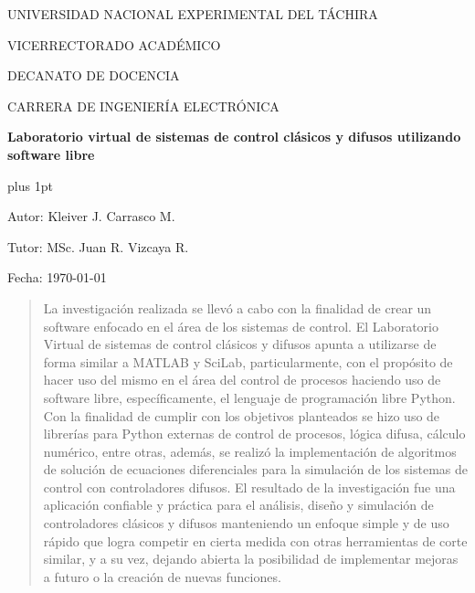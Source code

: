 \begin{center}
	\begin{spacing}{1}
		UNIVERSIDAD NACIONAL EXPERIMENTAL DEL TÁCHIRA
		
		VICERRECTORADO ACADÉMICO
		
		DECANATO DE DOCENCIA
		
		CARRERA DE INGENIERÍA ELECTRÓNICA
	
		\vspace{35pt}

		{\large \textbf{Laboratorio virtual de sistemas de control clásicos y difusos utilizando software libre}\par}
	
	\end{spacing}
\end{center}

\vspace{25pt}

\begin{flushright}
	\begin{spacing}{1}
		\parskip=0pt plus 1pt

		Autor: Kleiver J. Carrasco M.

		Tutor: MSc. Juan R. Vizcaya R.

		Fecha: \monthyearFecha\today
		
	\end{spacing}	
\end{flushright}

\vspace{15pt}

\begin{abstract}
	La investigación realizada se llevó a cabo con la finalidad de crear un software enfocado en el área de los sistemas de control. El Laboratorio Virtual de sistemas de control clásicos y difusos apunta a utilizarse de forma similar a MATLAB y SciLab, particularmente, con el propósito de hacer uso del mismo en el área del control de procesos haciendo uso de software libre, específicamente, el lenguaje de programación libre Python. Con la finalidad de cumplir con los objetivos planteados se hizo uso de librerías para Python externas de control de procesos, lógica difusa, cálculo numérico, entre otras, además, se realizó la implementación de algoritmos de solución de ecuaciones diferenciales para la simulación de los sistemas de control con controladores difusos. El resultado de la investigación fue una aplicación confiable y práctica para el análisis, diseño y simulación de controladores clásicos y difusos manteniendo un enfoque simple y de uso rápido que logra competir en cierta medida con otras herramientas de corte similar, y a su vez, dejando abierta la posibilidad de implementar mejoras a futuro o la creación de nuevas funciones.
\end{abstract}

